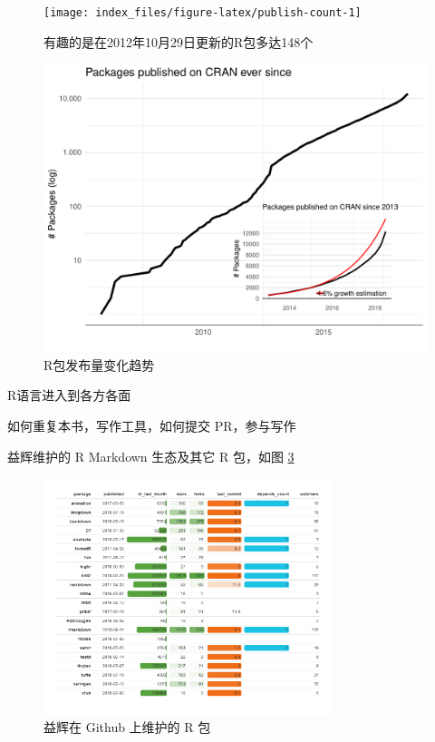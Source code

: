 \documentclass[a4paper,oneside,UTF8]{book}
\begin{document}
\begin{figure}

{\centering \texttt{[image: index\_files/figure-latex/publish-count-1]} 

}

\caption{有趣的是在2012年10月29日更新的R包多达148个}\label{fig:publish-count}
\end{figure}
\begin{figure}

{\centering \includegraphics[width=0.7\linewidth]{images/publish-packages} 

}

\caption{R包发布量变化趋势}\label{fig:publish-packages}
\end{figure}

R语言进入到各方各面

如何重复本书，写作工具，如何提交 PR，参与写作

益辉维护的 R Markdown 生态及其它 R 包，如图 \ref{fig:yihui-packages}

\begin{figure}
\centering
\includegraphics[width=0.75\textwidth,height=\textheight]{figures/packages.png}
\caption[\label{fig:yihui-packages} 益辉在 Github 上维护的 R 包]{\label{fig:yihui-packages} 益辉在 Github 上维护的 R 包\footnotemark{}}
\end{figure}
\end{document}
